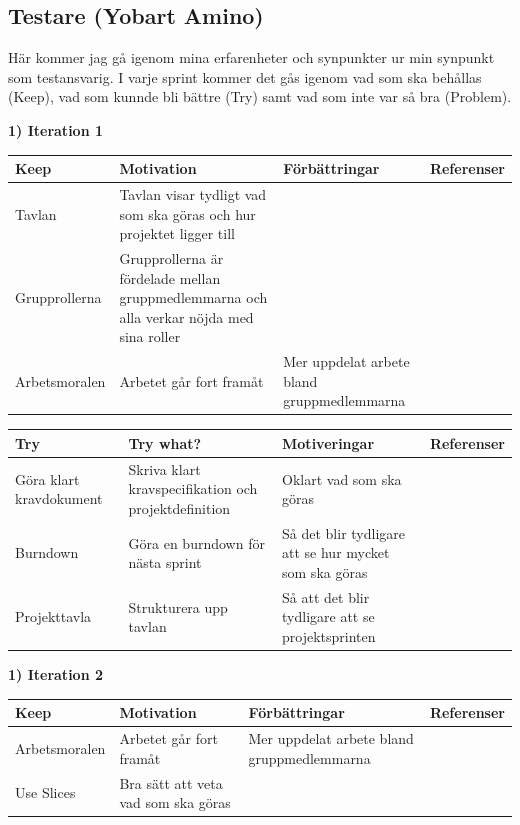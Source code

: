 \documentclass[conference,a4paper]{IEEEtran}
\newcommand\Tstrut{\rule{0pt}{2.6ex}}       %
\newcommand\Bstrut{\rule[-0.9ex]{0pt}{0pt}} %
\newcommand{\TBstrut}{\Tstrut\Bstrut} %
\begin{document}
\subsection{Testare (Yobart Amino)}
Här kommer jag gå igenom mina erfarenheter och synpunkter ur min synpunkt som testansvarig. I varje sprint kommer det gås igenom vad som ska behållas (Keep), vad som kunnde bli bättre (Try) samt vad som inte var så bra (Problem).

\textbf{1) Iteration 1}


\begin{table}[H]
	\small
  \centering
	\begin{tabular}{|p{1.5cm}|p{2cm}|p{1.8cm}|p{1.5cm}|} %
    \hline
    Keep & Motivation & Förbättringar & Referenser \TBstrut \\
    \hline
    Tavlan & Tavlan visar tydligt vad som ska göras och hur projektet ligger till &  &\TBstrut \\
    \hline
    Grupprollerna & Grupprollerna är fördelade mellan gruppmedlemmarna och alla verkar nöjda med sina roller &  & \TBstrut \\
    \hline
    Arbetsmoralen & Arbetet går fort framåt & Mer uppdelat arbete bland gruppmedlemmarna & \TBstrut \\
    \hline
  \end{tabular}
\end{table}

\begin{table}[H]
	\small
  \centering
	\begin{tabular}{|p{1.5cm}|p{2cm}|p{1.8cm}|p{1.5cm}|} %
    \hline
    Try & Try what? & Motiveringar & Referenser \TBstrut \\
    \hline
    Göra klart kravdokument & Skriva klart kravspecifikation och projektdefinition & Oklart vad som ska göras & \TBstrut \\
    \hline
    Burndown & Göra en burndown för nästa sprint & Så det blir tydligare att se hur mycket som ska göras &\TBstrut \\
    \hline
    Projekttavla & Strukturera upp tavlan & Så att det blir tydligare att se projektsprinten & \TBstrut \\
    \hline
  \end{tabular}
\end{table}

\textbf{1) Iteration 2}

\begin{table}[H]
	\small
  \centering
	\begin{tabular}{|p{1.5cm}|p{2cm}|p{1.8cm}|p{1.5cm}|} %
    \hline
    Keep & Motivation & Förbättringar & Referenser \TBstrut \\
    \hline
    Arbetsmoralen & Arbetet går fort framåt & Mer uppdelat arbete bland gruppmedlemmarna &\TBstrut \\
    \hline
    Use Slices & Bra sätt att veta vad som ska göras &  & \TBstrut \\
    \hline
  \end{tabular}
\end{table}
\end{document}
